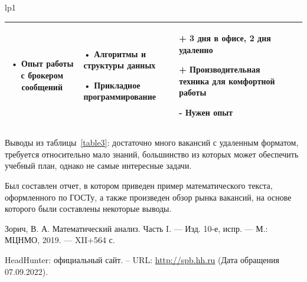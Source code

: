 \documentclass[14pt]{extreport}
\begin{document}
\begin{landscape}
\begin{longtable}[H]{lp{1\linewidth}}
\begin{small}
\begin{tabular}{|c|p{}|p{6cm}|p{5cm}|p{5cm}|}
•	Опыт работы с брокером сообщений &
•	Алгоритмы и структуры данных

•	Прикладное программирование & 
+	3 дня в офисе, 2 дня удаленно
 
+	Производительная техника для комфортной работы

-	Нужен опыт
\\

	\hline 


    \end{tabular}
    \end{small}
\end{longtable}

Выводы из таблицы~\ref{table3}: достаточно много вакансий с удаленным форматом, требуется относительно мало знаний, большинство из которых может обеспечить учебный план, однако не самые интересные задачи. 
\end{landscape}



\conclusions

Был составлен отчет, в котором приведен пример математического текста, оформленного по ГОСТу, а также произведен обзор рынка вакансий, на основе которого были составлены некоторые выводы.



\newpage
\begin{thebibliography}{99}
 Зорич, В. А. Математический анализ. Часть I. — Изд. 10-е, испр. — М.: МЦНМО, 2019. — XII+564 с.

 HeadHunter: официальный сайт. – URL: \url{http://spb.hh.ru} (Дата обращения 07.09.2022).
\end{thebibliography}
\end{document}
